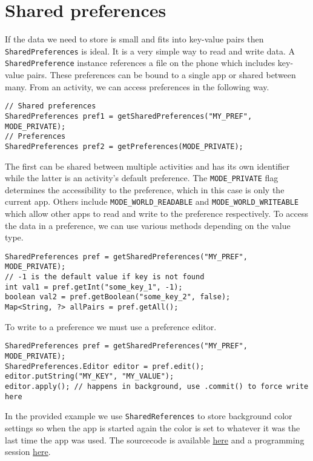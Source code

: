 \graphicspath{{./lab05/Images/}}


\maketocpage

\section{Shared preferences}
If the data we need to store is small and fits into key-value pairs then \texttt{SharedPreferences} is ideal. It is a very simple way to read and write data. A \texttt{SharedPreference} instance references a file on the phone which includes key-value pairs. These preferences can be bound to a single app or shared between many. From an activity, we can access preferences in the following way.
\begin{lstlisting}[style=A_Java]
// Shared preferences
SharedPreferences pref1 = getSharedPreferences("MY_PREF", MODE_PRIVATE);
// Preferences
SharedPreferences pref2 = getPreferences(MODE_PRIVATE);
\end{lstlisting}
The first can be shared between multiple activities and has its own identifier while the latter is an activity's default preference. The \texttt{MODE\_PRIVATE} flag determines the accessibility to the preference, which in this case is only the current app. Others include \texttt{MODE\_WORLD\_READABLE} and \texttt{MODE\_WORLD\_WRITEABLE} which allow other apps to read and write to the preference respectively. To access the data in a preference, we can use various methods depending on the value type.
\begin{lstlisting}[style=A_Java]
SharedPreferences pref = getSharedPreferences("MY_PREF", MODE_PRIVATE);
// -1 is the default value if key is not found
int val1 = pref.getInt("some_key_1", -1);
boolean val2 = pref.getBoolean("some_key_2", false);
Map<String, ?> allPairs = pref.getAll();
\end{lstlisting}
To write to a preference we must use a preference editor.
\begin{lstlisting}[style=A_Java]
SharedPreferences pref = getSharedPreferences("MY_PREF", MODE_PRIVATE);
SharedPreferences.Editor editor = pref.edit();
editor.putString("MY_KEY", "MY_VALUE");
editor.apply(); // happens in background, use .commit() to force write here
\end{lstlisting}
In the provided example we use \texttt{SharedReferences} to store background color settings so when the app is started again the color is set to whatever it was the last time the app was used. The sourcecode is available \href{https://github.com/JonSteinn/AndroidDevelopment/tree/master/examples/lab5/colorpref}{here} and a programming session \href{TODO}{here}.

